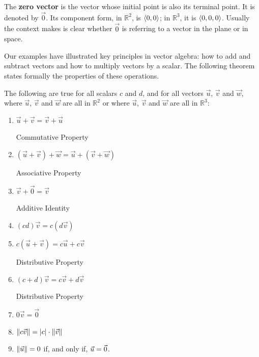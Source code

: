 The \textbf{zero vector} is the vector whose initial point is also its terminal point. It is denoted by $\vec 0$. Its component form, in $\mathbb{R}^2$, is $\left\langle 0,0\right\rangle$; in $\mathbb{R}^3$, it is $\left\langle 0,0,0\right\rangle$. Usually the context makes is clear whether $\vec 0$ is referring to a vector in the plane or in space.

Our examples have illustrated key principles in vector algebra: how to add and subtract vectors and how to multiply vectors by a scalar. The following theorem states formally the properties of these operations.

\begin{theorem}\label{thm:vector_properties}%
The following are true for all scalars $c$ and $d$, and for all vectors $\vec u$, $\vec v$ and $\vec w$, where $\vec u$, $\vec v$ and $\vec w$ are all in $\mathbb{R}^2$ or where $\vec u$, $\vec v$ and $\vec w$ are all in $\mathbb{R}^3$:
\begin{enumerate}
	\item \parbox{150pt}{$\vec u+\vec v = \vec v+\vec u$}Commutative Property
	\item \parbox{150pt}{$(\vec u+\vec v)+\vec w = \vec u+(\vec v+\vec w)$}Associative Property
	\item \parbox{150pt}{$\vec v+\vec 0 = \vec v$}Additive Identity
	\item \parbox{150pt}{$(cd)\vec v= c(d\vec v)$}
	\item \parbox{150pt}{$c(\vec u+\vec v) = c\vec u+c\vec v$}Distributive Property
	\item \parbox{150pt}{$(c+d)\vec v = c\vec v+d\vec v$}Distributive Property
	\item \parbox{150pt}{$0\vec v = \vec 0$}
	\item	\parbox{150pt}{$\left\lVert c\vec v \right\rVert = \left\lvert c \right\rvert\cdot\left\lVert \vec v \right\rVert$}\label{thm:norm_prop}
	\item	$\left\lVert \vec u \right\rVert = 0$ if, and only if, $\vec u = \vec 0$.  \label{thm:zero_norm}
\end{enumerate}
\end{theorem}

%

